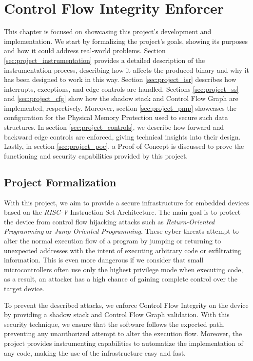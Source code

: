 \chapter{Control Flow Integrity Enforcer}
\label{cha:project}

This chapter is focused on showcasing this project's development and
implementation. We start by formalizing the project's goals, showing its
purposes and how it could address real-world problems. Section \ref{sec:project_instrumentation}
provides a detailed description of the instrumentation process, describing how
it affects the produced binary and why it has been designed to work in this way.
Section \ref{sec:project_isr} describes how interrupts, exceptions, and edge controls
are handled. Sections \ref{sec:project_ss} and \ref{sec:project_cfg} show how
the shadow stack and Control Flow Graph are implemented, respectively. Moreover,
section \ref{sec:project_pmp} showcases the configuration for the Physical Memory
Protection used to secure such data structures. In section
\ref{sec:project_controls}, we describe how forward and backward edge controls are
enforced, giving technical insights into their design. Lastly, in section
\ref{sec:project_poc}, a Proof of Concept is discussed to prove the functioning and
security capabilities provided by this project.

\section{Project Formalization}
\label{sec:project_formalization}

With this project, we aim to provide a secure infrastructure for embedded devices
based on the \textit{RISC-V} Instruction Set Architecture. The main goal is to protect
the device from control flow hijacking attacks such as \textit{Return-Oriented
Programming} or \textit{Jump-Oriented Programming}. These cyber-threats attempt
to alter the normal execution flow of a program by jumping or returning to
unexpected addresses with the intent of executing arbitrary code or exfiltrating
information. This is even more dangerous if we consider that small microcontrollers
often use only the highest privilege mode when executing code, as a result, an attacker
has a high chance of gaining complete control over the target device.

To prevent the described attacks, we enforce Control Flow Integrity on the
device by providing a shadow stack and Control Flow Graph validation. With this security
technique, we ensure that the software follows the expected path, preventing any
unauthorized attempt to alter the execution flow. Moreover, the project provides
instrumenting capabilities to automatize the implementation of any code, making
the use of the infrastructure easy and fast.

